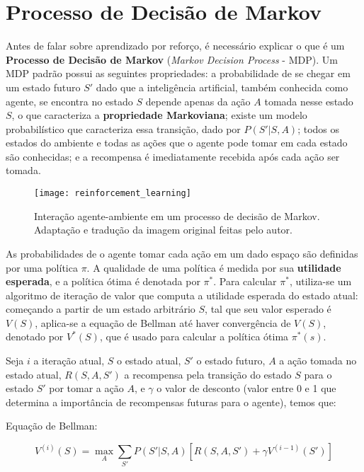
\section{Processo de Decisão de Markov}
\label{sec:mdp}

Antes de falar sobre aprendizado por reforço, é necessário explicar o que é um \textbf{Processo de Decisão de Markov} (\textit{Markov Decision Process} - MDP).
Um MDP padrão possui as seguintes propriedades:
a probabilidade de se chegar em um estado futuro $S'$ dado que a inteligência artificial, também conhecida como agente, se encontra no estado $S$ depende apenas da ação $A$ tomada nesse estado $S$, o que caracteriza a \textbf{propriedade Markoviana};
existe um modelo probabilístico que caracteriza essa transição, dado por $P(S'|S,A)$;
todos os estados do ambiente e todas as ações que o agente pode tomar em cada estado são conhecidas;
e a recompensa é imediatamente recebida após cada ação ser tomada.

\begin{figure}[h!]
\texttt{[image: reinforcement\_learning]}
\centering
\caption{Interação agente-ambiente em um processo de decisão de Markov\cite{sutton2018reinforcement}. Adaptação e tradução da imagem original feitas pelo autor.}
\end{figure}

As probabilidades de o agente tomar cada ação em um dado espaço são definidas por uma política $\pi$.
A qualidade de uma política é medida por sua \textbf{utilidade esperada}, e a política ótima é denotada por $\pi^{*}$.
Para calcular $\pi^{*}$, utiliza-se um algoritmo de iteração de valor que computa a utilidade esperada do estado atual:
começando a partir de um estado arbitrário $S$, tal que seu valor esperado é $V(S)$, aplica-se a equação de Bellman até haver convergência de $V(S)$, denotado por $V^{*}(S)$, que é usado para calcular a política ótima $\pi^{*}(s)$.

Seja $i$ a iteração atual, $S$ o estado atual, $S'$ o estado futuro, $A$ a ação tomada no estado atual, $R(S,A,S')$ a recompensa pela transição do estado $S$ para o estado $S'$ por tomar a ação $A$, e $\gamma$ o valor de desconto (valor entre 0 e 1 que determina a importância de recompensas futuras para o agente), temos que:

Equação de Bellman:

\begin{equation} \label{eq:bellman}
V^{(i)}(S) = \max_{A}\sum_{S'}P(S'|S,A)[R(S,A,S') + \gamma V^{(i-1)}(S')]
\end{equation}

